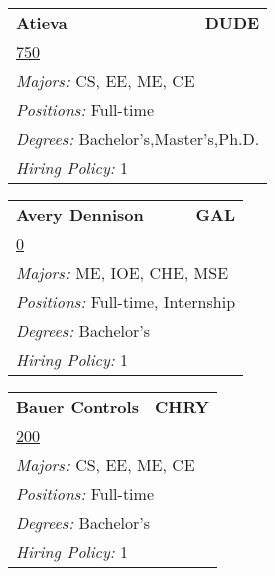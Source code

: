 \documentclass[twoside]{article}
\begin{document}
\begin{center}
\begin{multicols}{3}
\begin{FlushLeft}
\begin{minipage}{.9\columnwidth}
\end{minipage}
 
\begin{minipage}{.9\columnwidth}\begin{tabularx}{.95\columnwidth}{Xr}
                 {\Large\bf Atieva} & {\Large\bf DUDE}\\
    \multicolumn{2}{p{.95\columnwidth}}{\url{750}}\\
    \multicolumn{2}{p{.95\columnwidth}}{\emph{Majors:} CS, EE, ME, CE}\\
    \multicolumn{2}{p{.95\columnwidth}}{\emph{Positions:} Full-time}\\
    \multicolumn{2}{p{.95\columnwidth}}{\emph{Degrees:} Bachelor's,Master's,Ph.D.}\\
    \multicolumn{2}{p{.95\columnwidth}}{\emph{Hiring Policy:} 1}\\
    \end{tabularx}
    
\end{minipage}
 
\begin{minipage}{.9\columnwidth}\begin{tabularx}{.95\columnwidth}{Xr}
                 {\Large\bf Avery Dennison} & {\Large\bf GAL}\\
    \multicolumn{2}{p{.95\columnwidth}}{\url{0}}\\
    \multicolumn{2}{p{.95\columnwidth}}{\emph{Majors:} ME, IOE, CHE, MSE}\\
    \multicolumn{2}{p{.95\columnwidth}}{\emph{Positions:} Full-time, Internship}\\
    \multicolumn{2}{p{.95\columnwidth}}{\emph{Degrees:} Bachelor's}\\
    \multicolumn{2}{p{.95\columnwidth}}{\emph{Hiring Policy:} 1}\\
    \end{tabularx}
    
\end{minipage}
 
\begin{minipage}{.9\columnwidth}\begin{tabularx}{.95\columnwidth}{Xr}
                 {\Large\bf Bauer Controls} & {\Large\bf CHRY}\\
    \multicolumn{2}{p{.95\columnwidth}}{\url{200}}\\
    \multicolumn{2}{p{.95\columnwidth}}{\emph{Majors:} CS, EE, ME, CE}\\
    \multicolumn{2}{p{.95\columnwidth}}{\emph{Positions:} Full-time}\\
    \multicolumn{2}{p{.95\columnwidth}}{\emph{Degrees:} Bachelor's}\\
    \multicolumn{2}{p{.95\columnwidth}}{\emph{Hiring Policy:} 1}\\
    \end{tabularx}
    

\end{minipage}
\end{FlushLeft}
\end{multicols}
\end{center}
\end{document}

